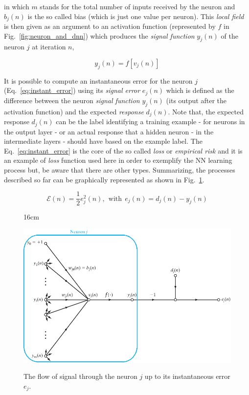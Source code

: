 in which $m$ stands for the total number of inputs received by the neuron and $b_{j}(n)$ is the so called bias (which is just one value per neuron). This \textit{local field} is then given as an argument to an activation function (represented by $\mathit{f}$ in Fig.~\ref{fig:neuron_and_dnn}) which produces the \textit{signal function} $y_{j}(n)$ of the neuron $j$ at iteration $n$,

\begin{equation}
y_{j}(n) = \mathit{f}[v_{j}(n)]
\end{equation}

It is possible to compute an instantaneous error for the neuron $j$ (Eq.~\ref{eq:instant_error}) using its \textit{signal error} $e_{j}(n)$ which is defined as the difference between the neuron \textit{signal function} $y_{j}(n)$ (its output after the activation function) and the expected \textit{response} $d_{j}(n)$. Note that, the expected response $d_{j}(n)$ can be the label identifying a training example - for neurons in the output layer - or an actual response that a hidden neuron - in the intermediate layers - should have based on the example label. The Eq.~\ref{eq:instant_error} is the core of the so called \textit{loss} or \textit{empirical risk} and it is an example of \textit{loss} function used here in order to exemplify the NN learning process but, be aware that there are other types. Summarizing, the processes described so far can be graphically represented as shown in Fig.~\ref{fig:neuronj_signal_flow}.

\begin{equation}
\label{eq:instant_error}
\mathcal{E}(n) = \frac{1}{2} e_{j}^{2}(n), ~~\mathrm{with}~~ e_{j}(n) = d_{j}(n) - y_{j}(n)
\end{equation}

\begin{figure}[hbtp]{16cm}
	\caption{The flow of signal through the neuron $j$ up to its instantaneous error $e_{j}$.}
	\centering
	\includegraphics[scale=0.5]{ChapterAnalysis/figs/neuronj_signal_flow}
	\label{fig:neuronj_signal_flow}
\end{figure}

